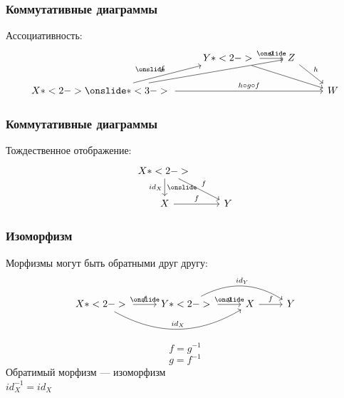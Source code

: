 \documentclass{beamer}
\begin{document}
\begin{frame}[fragile]
\frametitle{Коммутативные диаграммы}
Ассоциативность:
\begin{equation}
\begin{tikzcd}
& Y \arrow{r}{g}  \onslide*<2->{\arrow{rrd}}
& Z \arrow{rd}{h}
& \\ X \arrow{ru}{f} \onslide*<2->{\arrow{rru}} \onslide*<3->{\arrow{rrr}{h\circ g\circ f}}
&&& W
\end{tikzcd}
\end{equation}
\end{frame}

\begin{frame}[fragile]
\frametitle{Коммутативные диаграммы}
Тождественное отображение:
\begin{equation}
\begin{tikzcd}
X \arrow{d}[swap]{id_X} \onslide*<2->{\arrow{rd}{f}} & \\
X \arrow{r}{f} & Y
\end{tikzcd}
\end{equation}
\end{frame}

\begin{frame}[fragile]
\frametitle{Изоморфизм}
Морфизмы могут быть обратными друг другу:
\begin{equation}
\begin{tikzcd}
X \arrow{r}{f} \onslide*<2->{\arrow[bend right]{rr}{id_X}} & Y \arrow{r}{g} \onslide*<2->{\arrow[bend left]{rr}{id_Y}} & X \arrow{r}{f} & Y
\end{tikzcd}
\end{equation}
\pause
\begin{equation}f = g^{-1}\end{equation}
\begin{equation}g = f^{-1}\end{equation}
Обратимый морфизм --- изоморфизм
\\
\begin{math}id_X^{-1} = id_X\end{math}
\end{frame}
\end{document}
